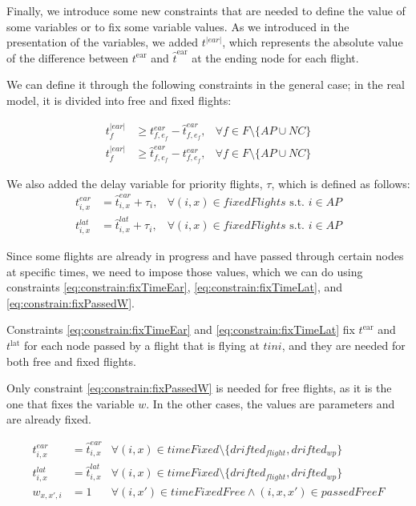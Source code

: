 \documentclass[../thesis.tex]{subfiles}
\begin{document}
Finally, we introduce some new constraints that are needed to define the value of some variables or to fix some variable values.  
As we introduced in the presentation of the variables, we added \( t^{|ear|} \), which represents the absolute value of the difference between \( t^\text{ear} \) and \( \hat{t}^\text{ear} \) at the ending node for each flight.  

We can define it through the following constraints in the general case; in the real model, it is divided into free and fixed flights:

\begin{align}\label{eq:constrain:defineAbsValueMercedes}
t^{|ear|}_{f} &\geq t^{ear}_{f,e_f} - \hat{t}^{ear}_{f,e_f}, & \forall f\in F\setminus\{AP \cup NC\}\\
t^{|ear|}_{f} &\geq \hat{t}^{ear}_{f,e_f} - t^{ear}_{f,e_f}, & \forall f\in F\setminus\{AP \cup NC\}
\end{align}

We also added the delay variable for priority flights, \( \tau \), which is defined as follows:
\begin{align}\label{eq:constrain:defineDelayPriorityMercedes}
t^{ear}_{i,x} &= \hat{t}^{ear}_{i,x} + \tau_i, & \forall (i,x) \in fixedFlights\text { s.t. } i\in AP\\
t^{lat}_{i,x} &= \hat{t}^{lat}_{i,x} + \tau_i, & \forall (i,x) \in fixedFlights\text { s.t. } i\in AP
\end{align}

Since some flights are already in progress and have passed through certain nodes at specific times, we need to impose those values, which we can do using constraints \ref{eq:constrain:fixTimeEar}, \ref{eq:constrain:fixTimeLat}, and \ref{eq:constrain:fixPassedW}.  

Constraints \ref{eq:constrain:fixTimeEar} and \ref{eq:constrain:fixTimeLat} fix $t^\text{ear}$ and $t^\text{lat}$ for each node passed by a flight that is flying at $tini$, and they are needed for both free and fixed flights.  

Only constraint \ref{eq:constrain:fixPassedW} is needed for free flights, as it is the one that fixes the variable $w$. In the other cases, the values are parameters and are already fixed.  

\begin{align}
t^{ear}_{i,x} &= \hat{t}^{ear}_{i,x} & \forall (i,x) \in timeFixed\setminus\{drifted_{flight},drifted_{wp}\}
\label{eq:constrain:fixTimeEar}\\
t^{lat}_{i,x} &= \hat{t}^{lat}_{i,x} & \forall (i,x) \in timeFixed\setminus\{drifted_{flight},drifted_{wp}\}
\label{eq:constrain:fixTimeLat}\\
w_{x,x',i} &= 1 & \forall (i,x') \in timeFixedFree \land (i,x,x')\in passedFreeF
\label{eq:constrain:fixPassedW}
\end{align}
\end{document}
